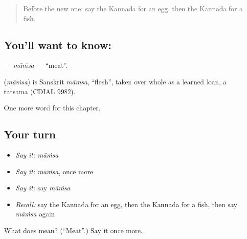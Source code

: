 \label{lesson:KA-C122-mamsa}



\begin{quote}
Before the new one: say the Kannada for an egg, then the Kannada for a fish.
\end{quote}

\subsection*{You'll want to know: }
\textbf{} — \emph{māṁsa} — \textquotedblleft{}meat\textquotedblright{}.

\begin{cousinweb}
\textbf{} (\emph{māṁsa}) is Sanskrit \emph{māṃsa}, \textquotedblleft{}flesh\textquotedblright{}, taken over whole as a learned loan, a tatsama (CDIAL 9982).
\end{cousinweb}

\begin{grammarlens}[title={What you've built}]
One more word for this chapter.
\end{grammarlens}

\subsection*{Your turn}
\begin{itemize}
\raggedright
  \item \emph{Say it:} \emph{māṁsa}
  \item \emph{Say it:} \emph{māṁsa}, once more
  \item \emph{Say it:} say \emph{māṁsa}
  \item \emph{Recall:} say the Kannada for an egg, then the Kannada for a fish, then say \emph{māṁsa} again
\end{itemize}

\begin{tcolorbox}[breakable,colback=teal!4,colframe=teal!35!black,title={Before you move on}]
What does  mean? (\textquotedblleft{}Meat\textquotedblright{}.) Say it once more.
\end{tcolorbox}
